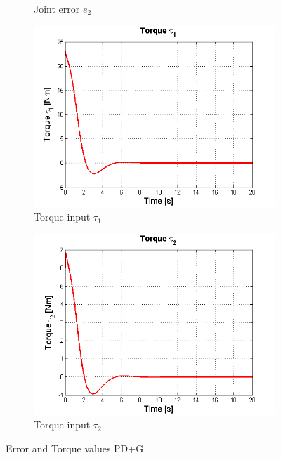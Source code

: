 \begin{figure}[tb]
\begin{subfigure}[b]{0.4\textwidth}
    \caption{Joint error $e_2$}
    \label{fig:e2g}
\end{subfigure}
\begin{subfigure}[b]{0.4\textwidth}
    \includegraphics[width=\textwidth] {imagenes/6-neuronal/T1g.png}
    \caption{Torque input $\tau_1$}
    \label{fig:T1g}
\end{subfigure}
\begin{subfigure}[b]{0.4\textwidth}
    \includegraphics[width=\textwidth] {imagenes/6-neuronal/T2g.png}
    \caption{Torque input $\tau_2$}
    \label{fig:T2g}
\end{subfigure}
\label{pdg}
\caption{Error and Torque values PD+G}
\end{figure}

